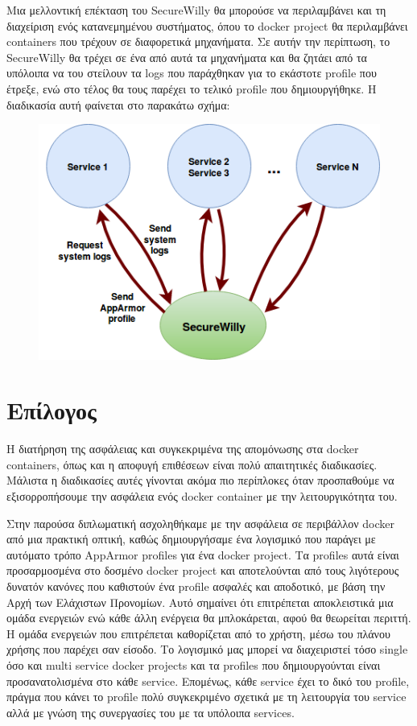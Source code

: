 Μια μελλοντική επέκταση του \en SecureWilly\gr{} θα μπορούσε να περιλαμβάνει και τη διαχείριση ενός κατανεμημένου συστήματος, όπου το \en docker project\gr{} θα περιλαμβάνει \en containers\gr{} που τρέχουν σε διαφορετικά μηχανήματα. Σε αυτήν την περίπτωση, το \en SecureWilly\gr{} θα τρέχει σε ένα από αυτά τα μηχανήματα και θα ζητάει από τα υπόλοιπα να του στείλουν τα \en logs\gr{} που παράχθηκαν για το εκάστοτε \en profile\gr{} που έτρεξε, ενώ στο τέλος θα τους παρέχει το τελικό \en profile\gr{} που δημιουργήθηκε. Η διαδικασία αυτή φαίνεται στο παρακάτω σχήμα:
\begin{figure}[H]
  \centering
   \includegraphics[width=0.6\linewidth]{figures/DistributedSystems.png}
\end{figure}

\section*{Επίλογος}

Η διατήρηση της ασφάλειας και συγκεκριμένα της απομόνωσης στα \en docker containers\gr{}, όπως και η αποφυγή επιθέσεων είναι πολύ απαιτητικές διαδικασίες. Μάλιστα η διαδικασίες αυτές γίνονται ακόμα πιο περίπλοκες όταν προσπαθούμε να εξισορροπήσουμε την ασφάλεια ενός \en docker container\gr{} με την λειτουργικότητα του.

Στην παρούσα διπλωματική ασχοληθήκαμε με την ασφάλεια σε περιβάλλον \en docker\gr{} από μια πρακτική οπτική, καθώς δημιουργήσαμε ένα λογισμικό που παράγει με αυτόματο τρόπο \en AppArmor profiles\gr{} για ένα \en docker project\gr{}. Τα \en profiles\gr{} αυτά είναι προσαρμοσμένα στο δοσμένο \en docker project\gr{} και αποτελούνται από τους λιγότερους δυνατόν κανόνες που καθιστούν ένα \en profile\gr{} ασφαλές και αποδοτικό, με βάση την Αρχή των Ελάχιστων Προνομίων. Αυτό σημαίνει ότι επιτρέπεται αποκλειστικά μια ομάδα ενεργειών ενώ κάθε άλλη ενέργεια θα μπλοκάρεται, αφού θα θεωρείται περιττή. Η ομάδα ενεργειών που επιτρέπεται καθορίζεται από το χρήστη, μέσω του πλάνου χρήσης που παρέχει σαν είσοδο. Το λογισμικό μας μπορεί να διαχειριστεί τόσο \en single\gr{} όσο και \en multi service docker projects\gr{} και τα \en profiles\gr{} που δημιουργούνται είναι προσανατολισμένα στο κάθε \en service\gr{}. Επομένως, κάθε \en service\gr{} έχει το δικό του \en profile\gr{}, πράγμα που κάνει το \en profile\gr{} πολύ συγκεκριμένο σχετικά με τη λειτουργία του \en service\gr{} αλλά με γνώση της συνεργασίες του με τα υπόλοιπα \en services\gr{}. 

